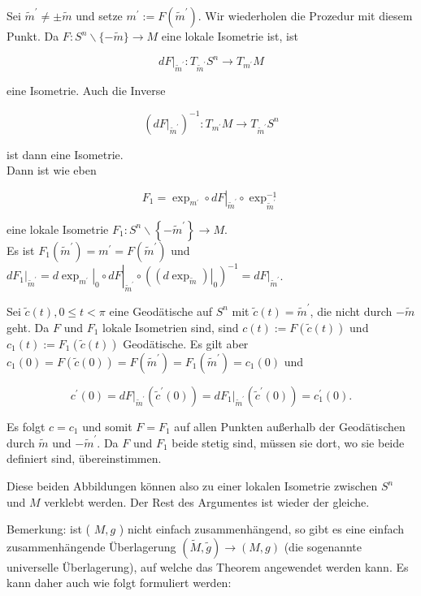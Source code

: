\documentclass[10pt]{article}
\begin{document}
Sei $\tilde{m}^{\prime} \neq \pm \tilde{m}$ und setze $m^{\prime}:=F\left(\tilde{m}^{\prime}\right)$. Wir wiederholen die Prozedur mit diesem Punkt. Da $F: S^{n} \backslash\{-\tilde{m}\} \rightarrow M$ eine lokale Isometrie ist, ist

$$
\left.d F\right|_{\tilde{m}^{\prime}}: T_{\tilde{m}^{\prime}} S^{n} \rightarrow T_{m^{\prime}} M
$$

eine Isometrie. Auch die Inverse

$$
\left(\left.d F\right|_{\tilde{m}^{\prime}}\right)^{-1}: T_{m^{\prime}} M \rightarrow T_{\tilde{m}^{\prime}} S^{n}
$$

ist dann eine Isometrie.\\
Dann ist wie eben

$$
F_{1}=\left.\exp _{m^{\prime}} \circ d F\right|_{\tilde{m}^{\prime}} \circ \exp _{\tilde{m}^{\prime}}^{-1}
$$

eine lokale Isometrie $F_{1}: S^{n} \backslash\left\{-\tilde{m}^{\prime}\right\} \rightarrow M$.\\
Es ist $F_{1}\left(\tilde{m}^{\prime}\right)=m^{\prime}=F\left(\tilde{m}^{\prime}\right)$ und $\left.d F_{1}\right|_{\tilde{m}^{\prime}}=\left.\left.d \exp _{m^{\prime}}\right|_{0} \circ d F\right|_{\tilde{m}^{\prime}} \circ\left(\left.\left(d \exp _{\tilde{m}}\right)\right|_{0}\right)^{-1}=\left.d F\right|_{\tilde{m}^{\prime}}$.

Sei $\tilde{c}(t), 0 \leq t<\pi$ eine Geodätische auf $S^{n}$ mit $\tilde{c}(t)=\tilde{m}^{\prime}$, die nicht durch $-\tilde{m}$ geht. Da $F$ und $F_{1}$ lokale Isometrien sind, sind $c(t):=F(\tilde{c}(t))$ und $c_{1}(t):=F_{1}(\tilde{c}(t))$ Geodätische. Es gilt aber $c_{1}(0)=F(\tilde{c}(0))=F\left(\tilde{m}^{\prime}\right)=F_{1}\left(\tilde{m}^{\prime}\right)=c_{1}(0)$ und

$$
c^{\prime}(0)=\left.d F\right|_{\tilde{m}^{\prime}}\left(\tilde{c}^{\prime}(0)\right)=\left.d F_{1}\right|_{\tilde{m}^{\prime}}\left(\tilde{c}^{\prime}(0)\right)=c_{1}^{\prime}(0) .
$$

Es folgt $c=c_{1}$ und somit $F=F_{1}$ auf allen Punkten außerhalb der Geodätischen durch $\tilde{m}$ und $-\tilde{m}^{\prime}$. Da $F$ und $F_{1}$ beide stetig sind, müssen sie dort, wo sie beide definiert sind, übereinstimmen.

Diese beiden Abbildungen können also zu einer lokalen Isometrie zwischen $S^{n}$ und $M$ verklebt werden. Der Rest des Argumentes ist wieder der gleiche.

Bemerkung: ist ( $M, g$ ) nicht einfach zusammenhängend, so gibt es eine einfach zusammenhängende Überlagerung $(\tilde{M}, \tilde{g}) \rightarrow(M, g)$ (die sogenannte universelle Überlagerung), auf welche das Theorem angewendet werden kann. Es kann daher auch wie folgt formuliert werden:
\end{document}

